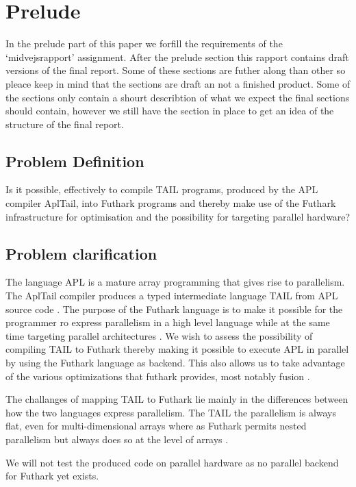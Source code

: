 \documentclass[11pt]{article}
\begin{document}
\section{Prelude}

In the prelude part of this paper we forfill the requirements of the `midvejsrapport' assignment. After the prelude section this rapport contains draft versions of the final report. Some of these sections are futher along than other so pleace keep in mind that the sections are draft an not a finished product. Some of the sections only contain a shourt describtion of what we expect the final sections should contain, however we still have the section in place to get an idea of the structure of the final report.  

\subsection{Problem Definition}
Is it possible, effectively to compile TAIL programs, produced by the APL compiler AplTail,
into Futhark programs and thereby make use of the Futhark infrastructure for optimisation
and the possibility for targeting parallel hardware?

\subsection{Problem clarification}
The language APL is a mature array programming that gives rise to parallelism. The AplTail compiler produces
a typed intermediate language TAIL from APL source code \cite{ElsmanDybdal:Array:2014}. The purpose of the Futhark language is to make it possible for the programmer ro express parallelism in a high level language while at the same time targeting parallel architectures \cite{TroelsHenriksen}.
We wish to assess the possibility of compiling TAIL to Futhark thereby making it possible to execute APL in parallel by using the Futhark language as backend. This also allows us to take advantage of the various optimizations that futhark provides, most notably fusion \cite{TroelsHenriksen}.

The challanges of mapping TAIL to Futhark lie mainly in the differences between how the two languages express parallelism.
The TAIL the parallelism is always flat, even for multi-dimensional arrays where as Futhark permits nested parallelism but always
does so at the level of arrays\cite{ElsmanDybdal:Array:2014} \cite{TroelsHenriksen}.

We will not test the produced code on parallel hardware as no parallel backend for Futhark yet exists.
\end{document}
